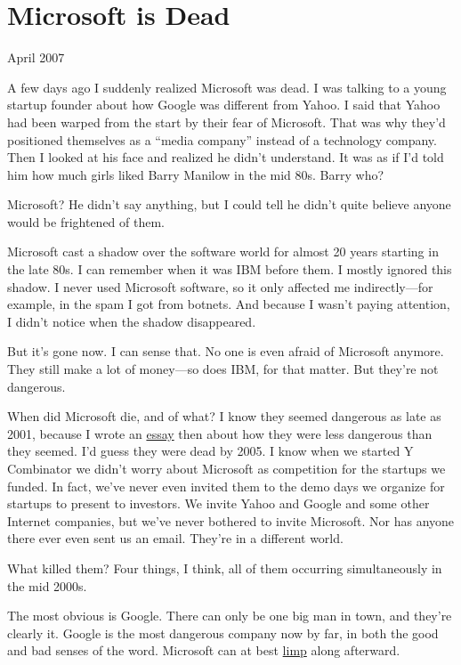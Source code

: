 \chapter{Microsoft is Dead}

April 2007

A few days ago I suddenly realized Microsoft was dead. I was talking to
a young startup founder about how Google was different from Yahoo. I
said that Yahoo had been warped from the start by their fear of
Microsoft. That was why they'd positioned themselves as a ``media
company'' instead of a technology company. Then I looked at his face and
realized he didn't understand. It was as if I'd told him how much girls
liked Barry Manilow in the mid 80s. Barry who?

Microsoft? He didn't say anything, but I could tell he didn't quite
believe anyone would be frightened of them.

Microsoft cast a shadow over the software world for almost 20 years
starting in the late 80s. I can remember when it was IBM before them. I
mostly ignored this shadow. I never used Microsoft software, so it only
affected me indirectly---for example, in the spam I got from botnets.
And because I wasn't paying attention, I didn't notice when the shadow
disappeared.

But it's gone now. I can sense that. No one is even afraid of Microsoft
anymore. They still make a lot of money---so does IBM, for that matter.
But they're not dangerous.

When did Microsoft die, and of what? I know they seemed dangerous as
late as 2001, because I wrote an \href{road.html}{essay} then about how
they were less dangerous than they seemed. I'd guess they were dead by
2005. I know when we started Y Combinator we didn't worry about
Microsoft as competition for the startups we funded. In fact, we've
never even invited them to the demo days we organize for startups to
present to investors. We invite Yahoo and Google and some other Internet
companies, but we've never bothered to invite Microsoft. Nor has anyone
there ever even sent us an email. They're in a different world.

What killed them? Four things, I think, all of them occurring
simultaneously in the mid 2000s.

The most obvious is Google. There can only be one big man in town, and
they're clearly it. Google is the most dangerous company now by far, in
both the good and bad senses of the word. Microsoft can at best
\href{http://live.com}{limp} along afterward.

